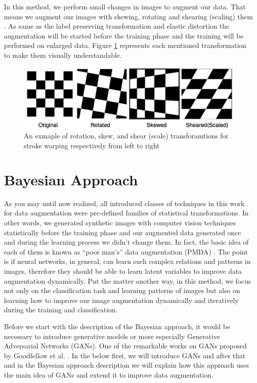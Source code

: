 In this method, we perform small changes in images to augment our data.  That means we augment our
images with skewing, rotating and shearing (scaling) them \cite{storke_warping_1997_source}. As same as the
label preserving transformation and elastic distortion the augmentation will be started before the
training phase and the training will be performed on enlarged data. Figure
\ref{fig:stroke_warping_transforamtions} represents each mentioned transformation to make them visually
understandable.

\begin{figure}
  \centering
  \label{fig:stroke_warping_transforamtions}
  \includegraphics[width=1\textwidth]{fig/stroke_warping_transforamtions}
  \caption{An exmaple of rotation, skew, and shear (scale) transforamtions for stroke warping respectively from left to right \cite{TODO-Augmentaion}}
\end{figure}


\section{Bayesian Approach}
\label{tit:bayesian-approach}
As you may until now realized, all introduced classes of techniques in this work for data
augmentation were pre-defined families of statistical transformations. In other words, we generated
synthetic images with computer vision techniques statistically before the training phase and our
augmented data generated once and during the learning process we didn't change them. In fact, the basic idea of each of
them is known as “poor man’s” data augmentation (PMDA) \cite{poor_man_data_augmentation}. The point
is if neural networks, in general, can learn such complex relations and patterns in images,
therefore they should be able to learn latent variables to improve data augmentation dynamically.
Put the matter another way, in this method, we focus not only on the classification task and
learning patterns of images but also on learning how to improve our image augmentation dynamically
and iteratively during the training and classification.

Before we start with the description of the Bayesian approach, it would be necessary to introduce
generative models or more especially Generative Adversarial Networks (GANs). One of the remarkable
works on GANs proposed by Goodfellow et al. \cite{TODO}. In the below first, we
will introduce GANs and after that and in the Bayesian approach description we will explain how this
approach uses the main idea of GANs and extend it to improve data augmentation.

